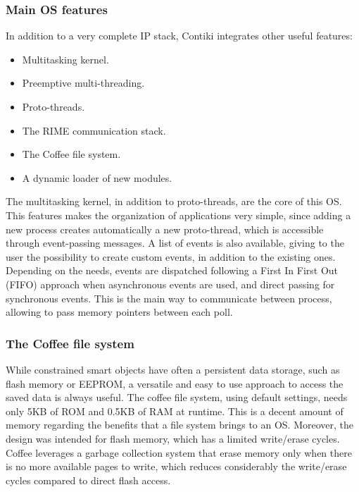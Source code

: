 \subsubsection{Main OS features}
In addition to a very complete IP stack, Contiki integrates other useful features:

\begin{itemize}
	\item Multitasking kernel.
	\item Preemptive multi-threading.
	\item Proto-threads\cite{dunkels2006protothreads}.
	\item The RIME communication stack\cite{dunkels2007rime}.
	\item The Coffee file system\cite{tsiftes09enabling}.
	\item A dynamic loader of new modules\cite{dunkels06runtime}.
\end{itemize}

The multitasking kernel, in addition to proto-threads, are the core of this OS.
This features makes the organization of applications very simple, since adding a new process creates automatically a new proto-thread, which is accessible through event-passing messages.
A list of events is also available, giving to the user the possibility to create custom events, in addition to the existing ones.
Depending on the needs, events are dispatched following a First In First Out (FIFO) approach when asynchronous events are used, and direct passing for synchronous events.
This is the main way to communicate between process, allowing to pass memory pointers between each poll.

\subsubsection{The Coffee file system}
While constrained smart objects have often a persistent data storage, such as flash memory or EEPROM, a versatile and easy to use approach to access the saved data is always useful.
The coffee file system, using default settings, needs only 5KB of ROM and 0.5KB of RAM at runtime.
This is a decent amount of memory regarding the benefits that a file system brings to an OS.
Moreover, the design was intended for flash memory, which has a limited write/erase cycles.
Coffee leverages a garbage collection system that erase memory only when there is no more available pages to write, which reduces considerably the write/erase cycles compared to direct flash access.

